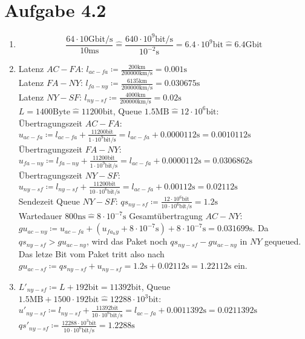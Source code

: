 \documentclass[12pt, a4paper]{article}
\begin{document}
\newpage


\section*{Aufgabe 4.2}
\begin{enumerate}[label=\alph*)]
	\item	$$\frac{64 \cdot 10 \text{Gbit/s}}{10 \text{ms}} \hat{=} \frac{640 \cdot 10^9 \text{bit/s}}{10^{-2} \text{s}} = 6.4 \cdot 10^9 \text{bit} \hat{=} 6.4 \text{Gbit}$$
	\item	Latenz $AC-FA$: $l_{ac-fa} \coloneqq \frac{200 \text{km}}{200000 \text{km/s}} = 0.001 \text{s}$ \\
			Latenz $FA-NY$: $l_{fa-ny} \coloneqq \frac{6135 \text{km}}{200000 \text{km/s}} = 0.030675 \text{s}$ \\
			Latenz $NY-SF$: $l_{ny-sf} \coloneqq \frac{4000 \text{km}}{200000 \text{km/s}} = 0.02 \text{s}$ \\
			
			$L=1400 \text{Byte} \hat{=} 11200 \text{bit}$, Queue $1.5 \text{MB} \hat{=} 12 \cdot 10^6 \text{bit}$: \\
			Übertragungszeit $AC-FA$: $u_{ac-fa} \coloneqq l_{ac-fa} + \frac{11200 \text{bit}}{1 \cdot 10^9 \text{bit/s}} = l_{ac-fa} + 0.0000112 \text{s} = 0.0010112 \text{s}$ \\
			Übertragungszeit $FA-NY$: $u_{fa-ny} \coloneqq l_{fa-ny} + \frac{11200 \text{bit}}{1 \cdot 10^9 \text{bit/s}} = l_{ac-fa} + 0.0000112 \text{s} = 0.0306862 \text{s}$ \\
			Übertragungszeit $NY-SF$: $u_{ny-sf} \coloneqq l_{ny-sf} + \frac{11200 \text{bit}}{10 \cdot 10^6 \text{bit/s}} = l_{ac-fa} + 0.00112 \text{s} = 0.02112 \text{s}$ \\
			Sendezeit Queue $NY-SF$: $qs_{ny-sf} \coloneqq \frac{12 \cdot 10^6 \text{bit}}{10 \cdot 10^6 \text{bit/s}} = 1.2 \text{s}$\\
			
			Wartedauer $800 \text{ns} \hat{=} 8 \cdot 10^{-7} \text{s}$
			Gesamtübertragung $AC-NY$: $gu_{ac-ny} \coloneqq u_{ac-fa} + (u_{fa_ny} + 8 \cdot 10^{-7} \text{s}) + 8 \cdot 10^{-7} \text{s} = 0.031699 \text{s}$.
			Da $qs_{ny-sf} > gu_{ac-ny}$, wird das Paket noch $qs_{ny-sf} - gu_{ac-ny}$ in $NY$ gequeued. Das letze Bit vom Paket tritt also nach $gu_{ac-sf} \coloneqq qs_{ny-sf} + u_{ny-sf} = 1.2 \text{s} + 0.02112 \text{s} = 1.22112 \text{s}$ ein.
	\item	$L'_{ny-sf} \coloneqq L + 192 \text{bit} = 11392 \text{bit}$, Queue $1.5 \text{MB} + 1500 \cdot 192 \text{bit} \hat{=} 12288 \cdot 10^3 \text{bit}$: \\
			$u'_{ny-sf} \coloneqq l_{ny-sf} + \frac{11392 \text{bit}}{10 \cdot 10^6 \text{bit/s}} = l_{ac-fa} + 0.0011392 \text{s} = 0.0211392 \text{s}$ \\
			$qs'_{ny-sf} \coloneqq \frac{12288 \cdot 10^3 \text{bit}}{10 \cdot 10^6 \text{bit/s}} = 1.2288 \text{s}$\\
			

\end{enumerate}
\end{document}
